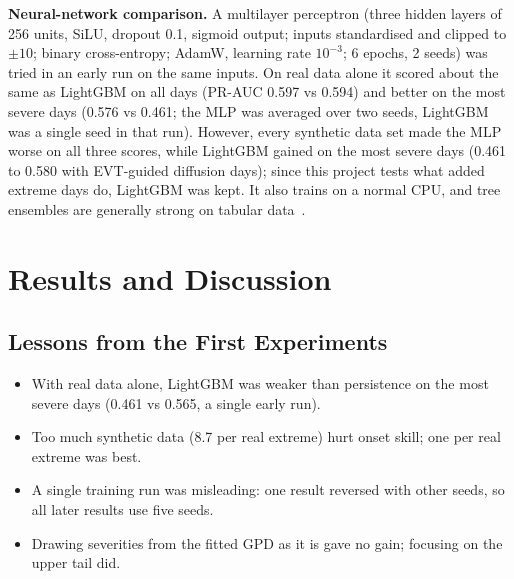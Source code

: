 \documentclass[12pt,a4paper]{report}
\begin{document}
\textbf{Neural-network comparison.} A multilayer perceptron (three hidden layers of 256 units, SiLU, dropout 0.1,
sigmoid output; inputs standardised and clipped to $\pm10$; binary cross-entropy; AdamW, learning rate $10^{-3}$;
6 epochs, 2 seeds) was tried in an early run on the same inputs. On real data alone it scored about the same as LightGBM
on all days (PR-AUC 0.597 vs 0.594) and better on the most severe days (0.576 vs 0.461; the MLP was averaged over two seeds, LightGBM was a single seed in that run). However, every
synthetic data set made the MLP worse on all three scores, while LightGBM gained on the most severe days (0.461
to 0.580 with EVT-guided diffusion days); since this project tests what added extreme
days do, LightGBM was kept. It also trains on a normal CPU, and tree ensembles are generally strong on tabular
data~\cite{grinsztajn2022tree}.

\chapter{Results and Discussion}
\label{ch:results}
\section{Lessons from the First Experiments}
\label{sec:lessons}
\begin{itemize}
  \item With real data alone, LightGBM was weaker than persistence on the most severe days (0.461 vs 0.565, a single
        early run).
  \item Too much synthetic data (8.7 per real extreme) hurt onset skill; one per real extreme was best.
  \item A single training run was misleading: one result reversed with other seeds, so all later results use five seeds.
  \item Drawing severities from the fitted GPD as it is gave no gain; focusing on the upper tail did.
\end{itemize}
\end{document}

